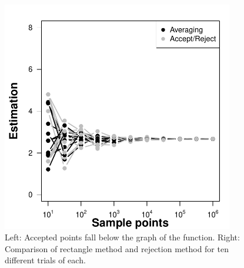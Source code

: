 \documentclass[11pt]{article}
\begin{document}
\begin{figure}[h!]
\begin{minipage}{0.48\textwidth}
\centering
\includegraphics[width=0.9\textwidth]{Ns.pdf}
\end{minipage}
\caption{Left: Accepted points fall below the graph of the function. Right: Comparison of rectangle method and rejection method for ten different trials of each.}\label{fig::compare}
\end{figure}
\end{document}
